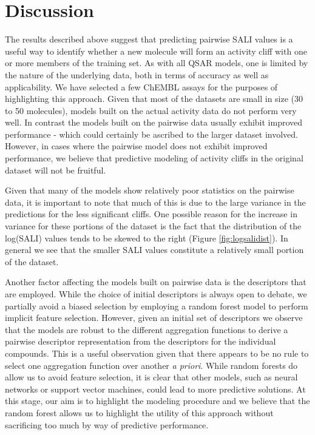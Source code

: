 \documentclass[letterpaper, 12pt]{article}
\begin{document}
\section{Discussion}
\label{sec:discussion}

The results described above suggest that predicting pairwise SALI values is a useful way to identify
whether a new molecule will form an activity cliff with one or more members of the training set. As
with all QSAR models, one is limited by the nature of the underlying data, both in terms of accuracy
as well as applicability. We have selected a few ChEMBL assays for the purposes of highlighting this
approach. Given that most of the datasets are small in size (30 to 50 molecules), models built on
the actual activity data do not perform very well. In contrast the models built on the pairwise data
usually exhibit improved performance - which could certainly be ascribed to the larger dataset
involved. However, in cases where the pairwise model does
not exhibit improved performance, we believe that predictive modeling of activity cliffs in the
original dataset will not be fruitful.

Given that many of the models show relatively poor statistics on the pairwise data, it is important
to note that much of this is due to the large variance in the predictions for the less significant
cliffs. One possible reason for the increase in variance for these portions of the dataset is the
fact that the distribution of the log(SALI) values tends to be skewed to the right
(Figure \ref{fig:logsalidist}). In general we see that the smaller SALI values constitute a relatively
small portion of the dataset.

Another factor affecting the models built on pairwise data is the descriptors that are
employed. While the choice of initial descriptors is always open to debate, we partially avoid a
biased selection by employing a random forest model to perform implicit feature selection. However,
given an initial set of descriptors we observe that the models are robust to the different
aggregation functions to derive a pairwise descriptor representation from the descriptors for the
individual compounds. This is a useful observation given that there appears to be no rule to select
one aggregation function over another \emph{a priori}. While random forests do allow us to avoid
feature selection, it is clear that other models, such as neural networks or support vector
machines, could lead to more predictive solutions. At this stage, our aim is to highlight the
modeling procedure and we believe that the random forest allows us to highlight the utility of this
approach without sacrificing too much by way of predictive performance.
\end{document}
